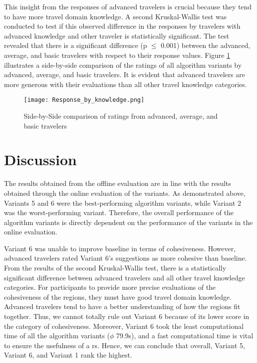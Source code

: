 This insight from the responses of advanced travelers is crucial because they tend to have more travel domain knowledge.  A second Kruskal-Wallis test was conducted to test if this observed difference in the responses by travelers with advanced knowledge and other traveler is statistically significant. The test revealed that there is a significant difference (p $\leq$ 0.001) between the advanced, average, and basic travelers with respect to their response values. Figure \ref{fig:stats_sig_all_knowledge} illustrates a side-by-side comparison of the ratings of all algorithm variants by advanced, average, and basic travelers. It is evident that advanced travelers are more generous with their evaluations than all other travel knowledge categories.

\begin{figure}[ht]
    \centering
    \texttt{[image: Response\_by\_knowledge.png]}
    \caption{Side-by-Side comparison of ratings from advanced, average, and basic travelers}
    \label{fig:stats_sig_all_knowledge}
\end{figure}

\section{Discussion}
The results obtained from the offline evaluation are in line with the results obtained through the online evaluation of the variants. As demonstrated above, Variants 5 and 6 were the best-performing algorithm variants, while Variant 2 was the worst-performing variant. Therefore, the overall performance of the algorithm variants is directly dependent on the performance of the variants in the online evaluation.


Variant 6 was unable to improve baseline in terms of cohesiveness. However, advanced travelers rated Variant 6's suggestions as more cohesive than baseline. From the results of the second Kruskal-Wallis test, there is a statistically significant difference between advanced
travelers and all other travel knowledge categories. For participants to provide more precise evaluations of the cohesiveness of the regions, they must have good travel domain knowledge. Advanced travelers tend to have a better understanding of how the regions fit together. Thus, we cannot totally rule out Variant 6 because of its lower score in the category of cohesiveness. Moreover, Variant 6 took the least computational time of all the algorithm variants ($\phi$ 79.9s), and a fast computational time is vital to ensure the usefulness of a \gls{rs}. Hence, we can conclude that overall, Variant 5, Variant 6, and Variant 1 rank the highest.


